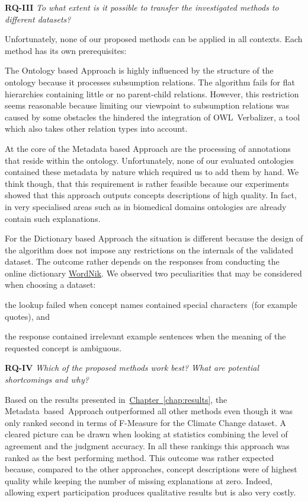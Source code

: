 \textbf{RQ-III} \emph{To what extent is it possible to transfer the investigated methods to different datasets?}

Unfortunately, none of our proposed methods can be applied in all contexts. Each method has its own prerequisites:

The Ontology based Approach is highly influenced by the structure of the ontology because it processes subsumption relations. The algorithm fails 
for flat hierarchies containing little or no parent-child relations. However, this restriction seems reasonable because limiting our viewpoint to subsumption relations was caused by some obstacles the hindered the integration of OWL~Verbalizer, a tool which also takes other relation types into account. 

At the core of the Metadata based Approach are the processing of annotations that reside within the ontology. Unfortunately, none of our evaluated ontologies contained these metadata by nature which required us to add them by hand. We think though, that this requirement is rather feasible because our experiments showed that this approach outputs concepts descriptions of high quality.  In fact, in very specialised areas such as in biomedical domains ontologies are already contain such explanations. 

For the Dictionary based Approach the situation is different because the design of the algorithm does not impose any restrictions on the internals of the validated dataset. The outcome rather depends on the responses from conducting the online dictionary \hyperref[sec:wordnik]{WordNik}. We observed two peculiarities that may be considered when choosing a dataset:
\begin{inparaenum}[i)]
	\item the lookup failed when concept names contained special characters~(for example quotes), and
	\item the response contained irrelevant example sentences when the meaning of the requested concept is ambiguous.
\end{inparaenum}


\textbf{RQ-IV} \emph{Which of the proposed methods work best? What are potential shortcomings and why?} 

Based on the results presented in~\hyperref[chap:results]{Chapter~\ref*{chap:results}}, the Metadata~based~Approach outperformed all other methods even though it was only ranked second in terms of F-Measure for the Climate Change dataset. A cleared picture can be drawn when looking at statistics combining the level of agreement and the judgment accuracy. In all these rankings this approach was ranked as the best performing method. This outcome was rather expected because, compared to the other approaches, concept descriptions were of highest quality while keeping the number of missing explanations at zero. Indeed, allowing expert participation produces qualitative results but is also very costly.  

